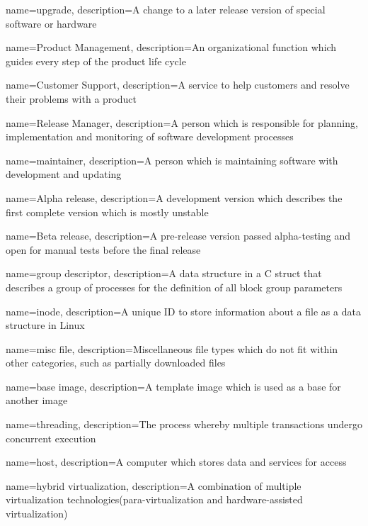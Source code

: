 {
    name={upgrade},
    description={A change to a later release version of special software or hardware}
}

{
    name={Product Management},
    description={An organizational function which guides every step of the product life cycle}
}

{
    name={Customer Support},
    description={A service to help customers and resolve their problems with a product}
}

{
    name={Release Manager},
    description={A person which is responsible for planning, implementation and monitoring of software development processes}
}

{
    name={maintainer},
    description={A person which is maintaining software with development and updating}
}

{
    name={Alpha release},
    description={A development version which describes the first complete version which is mostly unstable}
}

{
    name={Beta release},
    description={A pre-release version passed alpha-testing and open for manual tests before the final release}
}

{
    name={group descriptor},
    description={A data structure in a C struct that describes a group of processes for the definition of all block group parameters}
}

{
    name={inode},
    description={A unique ID to store information about a file as a data structure in Linux}
}

{
    name={misc file},
    description={Miscellaneous file types which do not fit within other categories, such as partially downloaded files}
}

{
    name={base image},
    description={A template image which is used as a base for another image}
}

{
    name={threading},
    description={The process whereby multiple transactions undergo concurrent execution}
}

{
    name={host},
    description={A computer which stores data and services for access}
}

{
    name={hybrid virtualization},
    description={A combination of multiple virtualization technologies(para-virtualization and hardware-assisted virtualization)}
}

